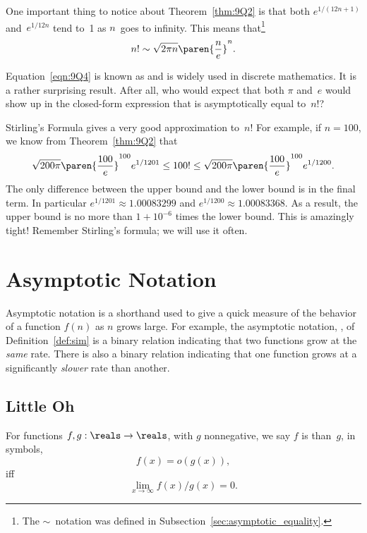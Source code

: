 One important thing to notice about Theorem~\ref{thm:9Q2} is that both
$e^{1/(12n + 1)}$ and~$e^{1/12n}$ tend to~1 as $n$~goes to infinity.
This means that\footnote{The $\sim$~notation was defined in
  Subsection~\ref{sec:asymptotic_equality}.}
\begin{equation}\label{eqn:9Q4}
    n! \sim \sqrt{2 \pi n} \paren{\frac{n}{e}}^n.
\end{equation}

Equation~\ref{eqn:9Q4} is known as  and is
widely used in discrete mathematics.  It is a rather surprising
result.  After all, who would expect that both $\pi$ and~$e$ would
show up in the closed-form expression that is asymptotically equal
to~$n!$?

Stirling's Formula gives a very good approximation to~$n!$  For
example, if $n = 100$, we know from Theorem~\ref{thm:9Q2} that
\begin{equation*}
    \sqrt{200\pi} \paren{\frac{100}{e}}^{100} e^{1/1201}
    \le 100!
    \le \sqrt{200\pi} \paren{\frac{100}{e}}^{100} e^{1/1200}.
\end{equation*}
The only difference between the upper bound and the lower bound is in
the final term.  In particular $e^{1/1201} \approx 1.00083299$ and
$e^{1/1200} \approx 1.00083368$.  As a result, the upper bound is no
more than $1 + 10^{-6}$ times the lower bound.  This is amazingly
tight!  Remember Stirling's formula; we will use it often.

\section{Asymptotic Notation}\label{asymptotic_sec}

Asymptotic notation is a shorthand used to give a quick measure of the
behavior of a function $f(n)$ as $n$ grows large.  For example, the
asymptotic notation, \idx{$\sim$}, of Definition~\ref{def:sim} is a
binary relation indicating that two functions grow at the \emph{same}
rate.  There is also a binary relation indicating that one function
grows at a significantly \emph{slower} rate than another.


\subsection{Little Oh}

\begin{definition}
  For functions $f,g: \reals \to \reals$, with $g$ nonnegative, we say
  $f$ is  than~$g$, in symbols,
\[
f(x) = o(g(x)),
\]
iff
\[
\lim_{x \rightarrow \infty} f(x)/g(x) = 0.
\]
\end{definition}


